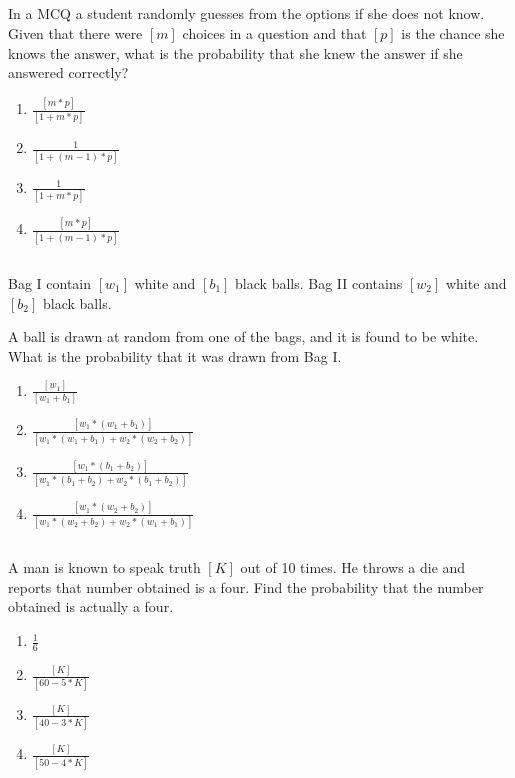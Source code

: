 
\begin{frame}
\section{}
In  a MCQ a student randomly guesses from the options if she does not know. Given that there were $[m]$ choices in a question and that $[p]$ is the chance she knows the answer, what is the probability that she knew the answer if she answered correctly?
\begin{enumerate}
\item $ \frac {[m*p]} {[1+m*p]} $
\item $ \frac {1} {[1+(m-1)*p]} $
\item $ \frac {1} {[1+m*p]} $
\item $ \frac {[m*p]} {[1+(m-1)*p]} $   %
\end{enumerate}
\end{frame}

\begin{frame}
\section{}
Bag I contain $[w_1]$ white and $[b_1]$ black balls. Bag II contains $[w_2]$ white and $[b_2]$ black balls.

A ball is drawn at random from one of the bags, and it is found to be white. What is the probability that it was drawn from Bag I.
\begin{enumerate}
\item $\frac{[w_1]}{[w_1 + b_1]}$
\item $\frac{[w_1*(w_1+b_1)]}{[w_1*(w_1+b_1) + w_2*(w_2+b_2)]}$
\item $\frac{[w_1*(b_1+b_2)]}{[w_1*(b_1+b_2) + w_2*(b_1+b_2)]}$
\item $\frac{[w_1*(w_2+b_2)]}{[w_1*(w_2+b_2) + w_2*(w_1+b_1)]}$    %
\end{enumerate}
\end{frame}

\begin{frame}
\section{}
A man is known to speak truth $[K]$ out of 10 times. He throws a die and reports that number obtained is a four. Find the probability that the number obtained is actually a four.
\begin{enumerate}
\item $\frac 1 6$
\item $\frac {[K]}{[60-5*K]} $
\item $\frac {[K]}{[40-3*K]} $
\item $\frac {[K]}{[50-4*K]} $   %
\end{enumerate}
\end{frame}

